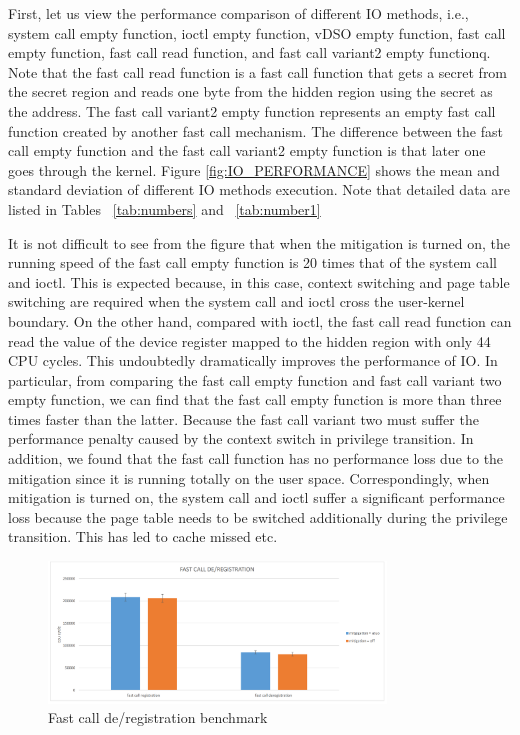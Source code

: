 First, let us view the performance comparison of different IO methods, i.e., 
system call empty function, ioctl empty function, vDSO empty function, fast call empty function, 
fast call read function, and fast call variant2 empty functionq. 
Note that the fast call read function is a fast call function that gets a secret 
from the secret region and reads one byte from the hidden region using the secret 
as the address. The fast call variant2 empty function represents an empty fast call 
function created by another fast call mechanism. The difference between the fast 
call empty function and the fast call variant2 empty function is that later one goes 
through the kernel.  Figure \ref{fig:IO_PERFORMANCE} shows the mean and standard deviation of different 
IO methods execution. Note that detailed data are listed in Tables ~\ref{tab:numbers} and ~\ref{tab:number1} 



It is not difficult to see from the figure that when the mitigation is 
turned on, the running speed of the fast call empty function is 20 times 
that of the system call and ioctl. This is expected because, in this case, 
context switching and page table switching are required when the system call 
and ioctl cross the user-kernel boundary.  On the other hand, compared with ioctl, 
the fast call read function can read the value of the device register mapped to the 
hidden region with only 44 CPU cycles. This undoubtedly dramatically improves the 
performance of IO. In particular, from comparing the fast call empty function 
and fast call variant two empty function, we can find that the fast call empty 
function is more than three times faster than the latter. Because the fast call 
variant two must suffer the performance penalty caused by the context switch 
in privilege transition. In addition, we found that the fast call function has 
no performance loss due to the mitigation since it is running totally on the 
user space. Correspondingly, when mitigation is turned on, the system call 
and ioctl suffer a significant performance loss because the page table needs 
to be switched additionally during the privilege transition. This has led 
to cache missed etc.



\begin{figure}[H]
  \centering
  \includegraphics[width=0.8\textwidth]{images/rederegistration}
  \caption[Fast call de/registration benchmark]{Fast call de/registration benchmark}
   \label{fig:rederegistration}
\end{figure}


